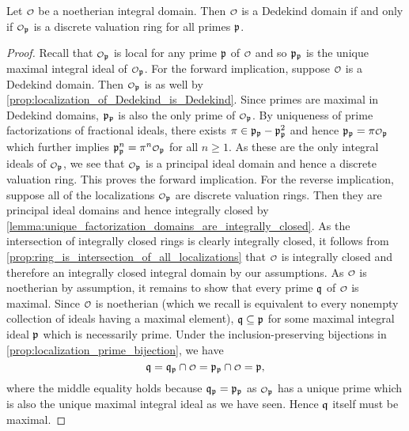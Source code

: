     \begin{theorem}\label{thm:Dedekind_if_and_only_if_all_localizations_are_discrete_valuation_rings}
      Let $\smc{O}$ be a noetherian integral domain. Then $\smc{O}$ is a Dedekind domain if and only if $\smc{O}_{\mf{p}}$ is a discrete valuation ring for all primes $\mathfrak{p}$.
    \end{theorem}
    \begin{proof}
      Recall that $\smc{O}_{\mf{p}}$ is local for any prime $\mathfrak{p}$ of $\smc{O}$ and so $\mathfrak{p}_{\mathfrak{p}}$ is the unique maximal integral ideal of $\smc{O}_{\mf{p}}$. For the forward implication, suppose $\smc{O}$ is a Dedekind domain. Then $\smc{O}_{\mf{p}}$ is as well by \cref{prop:localization_of_Dedekind_is_Dedekind}. Since primes are maximal in Dedekind domains, $\mathfrak{p}_{\mathfrak{p}}$ is also the only prime of $\smc{O}_{\mf{p}}$. By uniqueness of prime factorizations of fractional ideals, there exists $\pi \in \mathfrak{p}_{\mathfrak{p}}-\mathfrak{p}_{\mathfrak{p}}^{2}$ and hence $\mf{p}_{\mf{p}} = \pi\smc{O}_{\mf{p}}$ which further implies $\mf{p}_{\mf{p}}^{n} = \pi^{n}\smc{O}_{\mf{p}}$ for all $n \ge 1$. As these are the only integral ideals of $\smc{O}_{\mf{p}}$, we see that $\smc{O}_{\mf{p}}$ is a principal ideal domain and hence a discrete valuation ring. This proves the forward implication. For the reverse implication, suppose all of the localizations $\smc{O}_{\mf{p}}$ are discrete valuation rings. Then they are principal ideal domains and hence integrally closed by \cref{lemma:unique_factorization_domains_are_integrally_closed}. As the intersection of integrally closed rings is clearly integrally closed, it follows from \cref{prop:ring_is_intersection_of_all_localizations} that $\smc{O}$ is integrally closed and therefore an integrally closed integral domain by our assumptions. As $\smc{O}$ is noetherian by assumption, it remains to show that every prime $\mathfrak{q}$ of $\smc{O}$ is maximal. Since $\smc{O}$ is noetherian (which we recall is equivalent to every nonempty collection of ideals having a maximal element), $\mathfrak{q} \subseteq \mathfrak{p}$ for some maximal integral ideal $\mathfrak{p}$ which is necessarily prime. Under the inclusion-preserving bijections in \cref{prop:localization_prime_bijection}, we have
      \[
        \mf{q} = \mf{q}_{\mf{p}} \cap \smc{O} = \mf{p}_{\mf{p}} \cap \smc{O} = \mf{p},
      \]
      where the middle equality holds because $\mathfrak{q}_{\mathfrak{p}} = \mathfrak{p}_{\mathfrak{p}}$ as $\smc{O}_{\mf{p}}$ has a unique prime which is also the unique maximal integral ideal as we have seen. Hence $\mathfrak{q}$ itself must be maximal.
    \end{proof}

